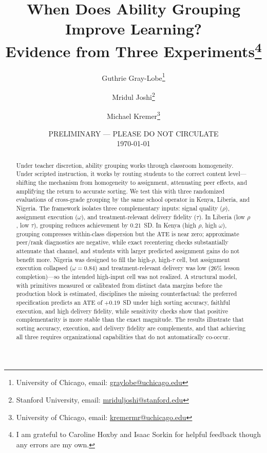 \documentclass[11pt]{article}
\title{When Does Ability Grouping Improve Learning? \\ Evidence from Three Experiments\footnote{I am grateful to Caroline Hoxby and Isaac Sorkin for helpful feedback though any errors are my own. } }
\begin{document}
\begin{titlepage}
\author{Guthrie Gray-Lobe\thanks{University of Chicago, email: \protect\href{mailto:graylobe@uchicago.edu}{graylobe@uchicago.edu}} \and Mridul Joshi\thanks{Stanford University, email: \protect\href{mailto:mriduljoshi@stanford.edu}{mriduljoshi@stanford.edu}} \and Michael Kremer\thanks{University of Chicago, email: \protect\href{mailto:kremermr@uchicago.edu}{kremermr@uchicago.edu}}}

\date{PRELIMINARY --- PLEASE DO NOT CIRCULATE \\ \today}
\maketitle

\begin{abstract}\noindent
Under teacher discretion, ability grouping works through classroom homogeneity. Under scripted instruction, it works by routing students to the correct content level---shifting the mechanism from homogeneity to assignment, attenuating peer effects, and amplifying the return to accurate sorting. We test this with three randomized evaluations of cross-grade grouping by the same school operator in Kenya, Liberia, and Nigeria. The framework isolates three complementary inputs: signal quality ($\rho$), assignment execution ($\omega$), and treatment-relevant delivery fidelity ($\tau$). In Liberia (low $\rho$, low $\tau$), grouping reduces achievement by $0.21$~SD. In Kenya (high $\rho$, high $\omega$), grouping compresses within-class dispersion but the ATE is near zero; approximate peer/rank diagnostics are negative, while exact recentering checks substantially attenuate that channel, and students with larger predicted assignment gains do not benefit more. Nigeria was designed to fill the high-$\rho$, high-$\tau$ cell, but assignment execution collapsed ($\omega = 0.84$) and treatment-relevant delivery was low (26\% lesson completion)---so the intended high-input cell was not realized. A structural model, with primitives measured or calibrated from distinct data margins before the production block is estimated, disciplines the missing counterfactual: the preferred specification predicts an ATE of $+0.19$~SD under high sorting accuracy, faithful execution, and high delivery fidelity, while sensitivity checks show that positive complementarity is more stable than the exact magnitude. The results illustrate that sorting accuracy, execution, and delivery fidelity are complements, and that achieving all three requires organizational capabilities that do not automatically co-occur.

\end{abstract}
\setcounter{page}{0}
\thispagestyle{empty}
\end{titlepage}
\doublespacing
\end{document}
